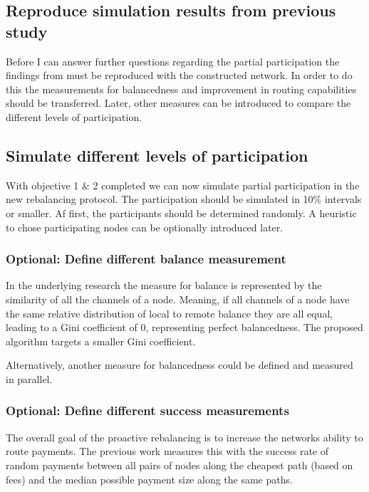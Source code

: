 \documentclass[final]{fhnwreport}       %
\begin{document}
\subsection{Reproduce simulation results from previous study}\label{sec:o_repro}
Before I can answer further questions regarding the partial participation the findings from \cite{pickhardt_imbalance_2019} must be reproduced with the constructed network. In order to do this the measurements for balancedness and improvement in routing capabilities should be transferred. Later, other measures can be introduced to compare the different levels of participation.

\subsection{Simulate different levels of participation}\label{sec:o_sim}
With objective 1 \& 2 completed we can now simulate partial participation in the new rebalancing protocol. The participation should be simulated in 10\% intervals or smaller. Af first, the participants should be determined randomly. A heuristic to chose participating nodes can be optionally introduced later.

\subsubsection{Optional: Define different balance measurement}
In the underlying research \cite{pickhardt_imbalance_2019} the measure for balance is represented by the similarity of all the channels of a node. Meaning, if all channels of a node have the same relative distribution of local to remote balance they are all equal, leading to a Gini coefficient of $0$, representing perfect balancedness. The proposed algorithm targets a smaller Gini coefficient.

Alternatively, another measure for balancedness could be defined and measured in parallel. 

\subsubsection{Optional: Define different success measurements}
The overall goal of the proactive rebalancing is to increase the networks ability to route payments. The previous work \cite{pickhardt_imbalance_2019} measures this with the success rate of random payments between all pairs of nodes along the cheapest path (based on fees) and the median possible payment size along the same paths. 
\end{document}
